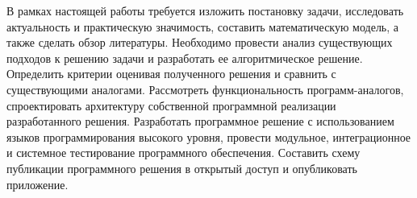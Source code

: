 В рамках настоящей работы требуется изложить постановку задачи, исследовать актуальность и практическую значимость, составить математическую модель, а также сделать обзор литературы. Необходимо провести анализ существующих подходов к решению задачи и разработать ее алгоритмическое решение. Определить критерии оценивая полученного решения и сравнить с существующими аналогами. Рассмотреть функциональность программ-аналогов, спроектировать архитектуру собственной программной реализации разработанного решения. Разработать программное решение с использованием языков программирования высокого уровня, провести модульное, интеграционное и системное тестирование программного обеспечения. Составить схему публикации программного решения в открытый доступ и опубликовать приложение.
